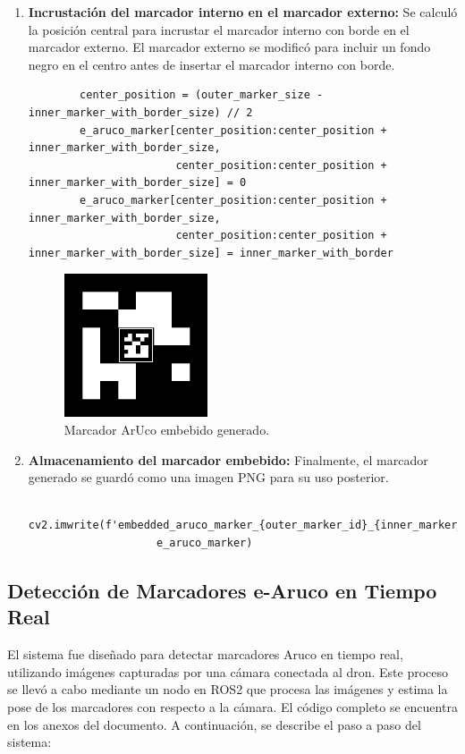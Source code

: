 \begin{enumerate}
    
        \item \textbf{Incrustación del marcador interno en el marcador externo:} 
        Se calculó la posición central para incrustar el marcador interno con borde en el marcador externo. El marcador externo se modificó para incluir un fondo negro en el centro antes de insertar el marcador interno con borde.
        \begin{verbatim}
        center_position = (outer_marker_size - inner_marker_with_border_size) // 2
        e_aruco_marker[center_position:center_position + inner_marker_with_border_size,
                       center_position:center_position + inner_marker_with_border_size] = 0
        e_aruco_marker[center_position:center_position + inner_marker_with_border_size,
                       center_position:center_position + inner_marker_with_border_size] = inner_marker_with_border
        \end{verbatim}
        \begin{center}
            \begin{figure}[h!]
                \centering
                \includegraphics[width=0.4\textwidth]{pictures/embedded_aruco.png}
                \caption{Marcador ArUco embebido generado.}
            \end{figure}
        \end{center}
    
        \item \textbf{Almacenamiento del marcador embebido:} 
        Finalmente, el marcador generado se guardó como una imagen PNG para su uso posterior.
        \begin{verbatim}
        cv2.imwrite(f'embedded_aruco_marker_{outer_marker_id}_{inner_marker_id}.png', 
                    e_aruco_marker)
        \end{verbatim}
    \end{enumerate}


\subsection{Detección de Marcadores e-Aruco en Tiempo Real} 
    El sistema fue diseñado para detectar marcadores Aruco en tiempo real, utilizando imágenes capturadas por una cámara conectada al dron. Este proceso se llevó a cabo mediante un nodo en ROS2 que procesa las imágenes y estima la pose de los marcadores con respecto a la cámara. El código completo se encuentra en los anexos del documento. A continuación, se describe el paso a paso del sistema:
    
